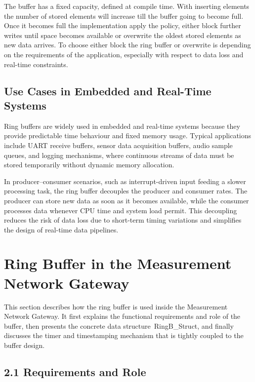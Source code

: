 The buffer has a fixed capacity, defined at compile time. With inserting
elements the number of stored elements will increase till the buffer
going to become full. Once it becomes full the implementation apply the
policy, either block further writes until space becomes available or
overwrite the oldest stored elements as new data arrives. To choose
either block the ring buffer or overwrite is depending on the
requirements of the application, especially with respect to data loss
and real-time constraints.

\subsection{Use Cases in Embedded and Real-Time
Systems}\label{use-cases-in-embedded-and-real-time-systems}

Ring buffers are widely used in embedded and real-time systems because
they provide predictable time behaviour and fixed memory usage. Typical
applications include UART receive buffers, sensor data acquisition
buffers, audio sample queues, and logging mechanisms, where continuous
streams of data must be stored temporarily without dynamic memory
allocation.

In producer--consumer scenarios, such as interrupt-driven input feeding
a slower processing task, the ring buffer decouples the producer and
consumer rates. The producer can store new data as soon as it becomes
available, while the consumer processes data whenever CPU time and
system load permit. This decoupling reduces the risk of data loss due to
short-term timing variations and simplifies the design of real-time data
pipelines.

\section{Ring Buffer in the Measurement Network
Gateway}\label{ring-buffer-in-the-measurement-network-gateway}

This section describes how the ring buffer is used inside the
Measurement Network Gateway. It first explains the functional
requirements and role of the buffer, then presents the concrete data
structure~RingB\_Struct, and finally discusses the timer and
timestamping mechanism that is tightly coupled to the buffer design.

\subsection{2.1 Requirements and Role}\label{requirements-and-role}

